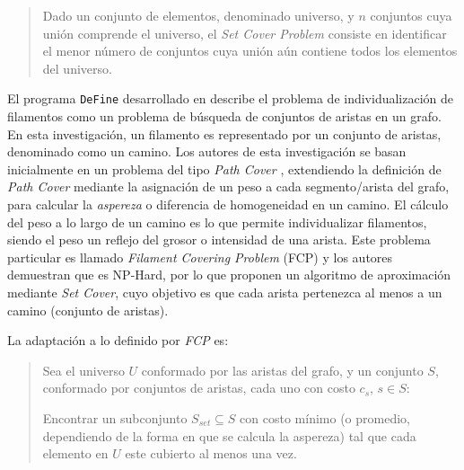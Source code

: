 \begin{quote}
Dado un conjunto de elementos, denominado universo, y $n$ conjuntos cuya unión comprende el universo, el {\it Set Cover Problem} consiste en identificar el menor n\'umero de conjuntos cuya unión a\'un contiene todos los elementos del universo.
\end{quote}


\medskip

El programa \texttt{DeFine} desarrollado en \citet{breuer2015define} describe el problema de individualizaci\'on de filamentos como un problema de b\'usqueda de conjuntos de aristas en un grafo. En esta investigaci\'on, un filamento es representado por un conjunto de aristas, denominado como un camino. Los autores de esta investigaci\'on se basan inicialmente en un problema del tipo {\it Path Cover} , extendiendo la definici\'on de {\it Path Cover} mediante la asignaci\'on de un peso a cada segmento/arista del grafo, para calcular la {\it aspereza} o diferencia de homogeneidad en un camino. El c\'alculo del peso a lo largo de un camino es lo que permite individualizar filamentos, siendo el peso un reflejo del grosor o intensidad de una arista.
Este problema particular es llamado {\it Filament Covering Problem} (FCP) y los autores demuestran que es NP-Hard, por lo que proponen un algoritmo de aproximaci\'on mediante {\it Set Cover}, cuyo objetivo es que cada arista pertenezca al menos a un camino (conjunto de aristas).

La adaptaci\'on a lo definido por {\it FCP} es: 
\begin{quote}
Sea el universo $U$ conformado por las aristas del grafo, y un conjunto $S$, conformado por conjuntos de aristas, cada uno con costo $c_s$, $s \in S$:

Encontrar un subconjunto $S_{set} \subseteq S$ con costo m\'inimo (o promedio, dependiendo de la forma en que se calcula la aspereza) tal que cada elemento en $U$ este cubierto al menos una vez.
\end{quote}

